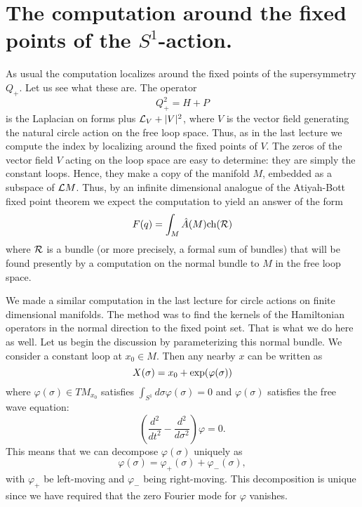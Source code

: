 \section{The computation around the fixed points of the $S^1$-action.}

As usual the computation localizes around the fixed points of the
supersymmetry $Q_+$. Let us see what these are.
The operator
$$Q_+^2=H+P$$
is the Laplacian on forms plus ${\cal L}_V+|V|^2$,
where $V$ is the vector field generating the natural circle action on
the free loop space.
Thus, as in the last lecture we compute the index by localizing around
the fixed points of $V$.
The zeros of the vector field $V$ acting on the loop space are easy to
determine: they 
are simply the constant loops. Hence, they make a copy of the manifold
$M$, embedded as a subspace of ${\cal L}M$. Thus, by an infinite dimensional
analogue of the Atiyah-Bott fixed point theorem we expect the
computation to yield an answer of the form
$$F(q)=\int_M\hat A(M){\rm ch}({\cal R})$$
where ${\cal R}$ is a bundle (or more precisely, a formal sum of
bundles) that will be found presently
by a computation on the normal bundle to $M$ in the 
free loop space.

We made a similar computation in the last lecture for circle actions
on finite dimensional manifolds. The method was to find the kernels of
the Hamiltonian operators in the normal direction to the fixed point
set.
That is what we do here as well.
Let us begin the discussion by parameterizing this normal bundle. We
consider a constant loop at $x_0\in M$. Then any nearby $x$ can be
written as
$$X(\sigma)=x_0+{\rm exp}(\varphi(\sigma))$$
where $\varphi(\sigma)\in TM_{x_0}$ satisfies
$\int_{S^1}d\sigma\varphi(\sigma)=0$ and $\varphi(\sigma)$ satisfies
the free wave equation:
$$\left(\frac{d^2}{dt^2}-\frac{d^2}{d\sigma^2}\right)\varphi=0.$$
This means that we can decompose $\varphi(\sigma)$ uniquely as
$$\varphi(\sigma)=\varphi_+(\sigma)+\varphi_-(\sigma),$$
with $\varphi_+$ be left-moving and $\varphi_-$ being right-moving.
This decomposition is unique since we have required that the zero
Fourier mode for  $\varphi$ vanishes.

